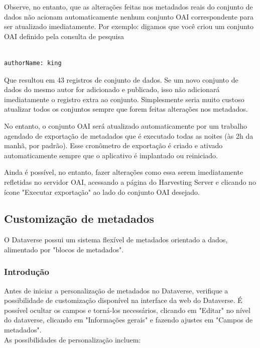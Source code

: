 \documentclass[12pt,hidelinks]{article}
\begin{document}
Observe, no entanto, que as alterações feitas nos metadados reais do conjunto de dados não acionam automaticamente nenhum conjunto OAI correspondente para ser atualizado imediatamente. Por exemplo: digamos que você criou um conjunto OAI definido pela consulta de pesquisa

\begin{verbatim}

authorName: king 

\end{verbatim}

Que resultou em 43 registros de conjunto de dados. Se um novo conjunto de dados do mesmo autor for adicionado e publicado, isso não adicionará imediatamente o registro extra ao conjunto. Simplesmente seria muito custoso atualizar todos os conjuntos sempre que forem feitas alterações nos metadados.

No entanto, o conjunto OAI será atualizado automaticamente por um trabalho agendado de exportação de metadados que é executado todas as noites (às 2h da manhã, por padrão). Esse cronômetro de exportação é criado e ativado automaticamente sempre que o aplicativo é implantado ou reiniciado.

Ainda é possível, no entanto, fazer alterações como essa serem imediatamente refletidas no servidor OAI, acessando a página do Harvesting Server e clicando no ícone "Executar exportação" ao lado do conjunto OAI desejado.

\subsection{Customização de metadados}

\qquad  O Dataverse possui um sistema flexível de metadados orientado a dados, alimentado por "blocos de metadados".

\subsubsection{Introdução}

\qquad Antes de iniciar a personalização de metadados no Dataverse, verifique a possibilidade de customização disponível na interface da web do Dataverse. É possível ocultar os campos e torná-los necessários, clicando em "Editar" no nível do dataverse, clicando em "Informações gerais" e fazendo ajustes em "Campos de metadados".\\

As possibilidades de personalização incluem:
\end{document}
